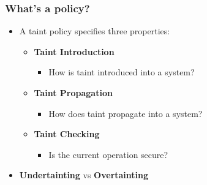 \begin{frame}
	\frametitle{What's a policy?}
	\begin{itemize}
		\item A taint policy specifies three properties:
		\begin{itemize}
			\item \textbf{Taint Introduction}
			\begin{itemize}
				\item How is taint introduced into a system?
			\end{itemize}
			\item \textbf{Taint Propagation}
			\begin{itemize}
				\item How does taint propagate into a system?
			\end{itemize}
			\item \textbf{Taint Checking}
			\begin{itemize}
				\item Is the current operation secure? \newline
			\end{itemize}
		\end{itemize}
		\item \textbf{Undertainting} vs \textbf{Overtainting}
	\end{itemize}
\end{frame}